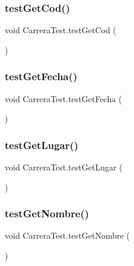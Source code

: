 \subsubsection{\texorpdfstring{testGetCod()}{testGetCod()}}
{\footnotesize\ttfamily void Carrera\+Test.\+test\+Get\+Cod (\begin{DoxyParamCaption}{ }\end{DoxyParamCaption})}

\mbox{\label{class_carrera_test_a7313b1e9c22029753dd39c7ae4fd5044}} 
\subsubsection{\texorpdfstring{testGetFecha()}{testGetFecha()}}
{\footnotesize\ttfamily void Carrera\+Test.\+test\+Get\+Fecha (\begin{DoxyParamCaption}{ }\end{DoxyParamCaption})}

\mbox{\label{class_carrera_test_a34b8f775dcc547ce1c27af2b07df3b74}} 
\subsubsection{\texorpdfstring{testGetLugar()}{testGetLugar()}}
{\footnotesize\ttfamily void Carrera\+Test.\+test\+Get\+Lugar (\begin{DoxyParamCaption}{ }\end{DoxyParamCaption})}

\mbox{\label{class_carrera_test_aa5f89ec4be4d345d7f2b7331821415cd}} 
\subsubsection{\texorpdfstring{testGetNombre()}{testGetNombre()}}
{\footnotesize\ttfamily void Carrera\+Test.\+test\+Get\+Nombre (\begin{DoxyParamCaption}{ }\end{DoxyParamCaption})}

